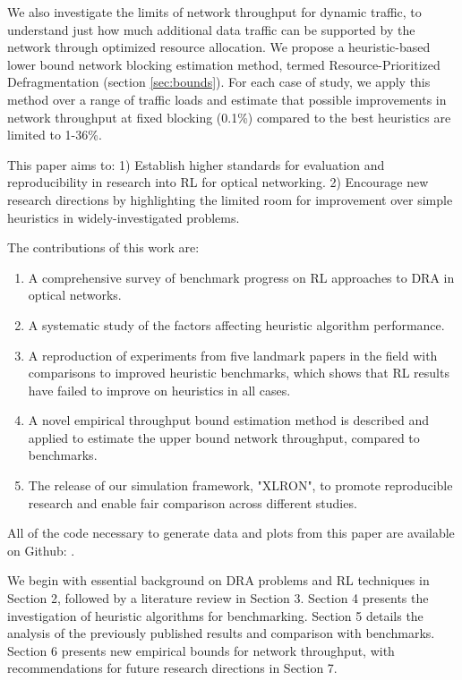 We also investigate the limits of network throughput for dynamic traffic, to understand just how much additional data traffic can be supported by the network through optimized resource allocation. We propose a heuristic-based lower bound network blocking estimation method, termed Resource-Prioritized Defragmentation (section \ref{sec:bounds}). For each case of study, we apply this method over a range of traffic loads and estimate that possible improvements in network throughput at fixed blocking (0.1\%) compared to the best heuristics are limited to 1-36\%.

This paper aims to: 1) Establish higher standards for evaluation and reproducibility in research into RL for optical networking. 2) Encourage new research directions by highlighting the limited room for improvement over simple heuristics in widely-investigated problems. 

The contributions of this work are:
\begin{enumerate}[itemsep=0pt]
    \item A comprehensive survey of benchmark progress on RL approaches to DRA in optical networks.
    \item A systematic study of the factors affecting heuristic algorithm performance.
    \item A reproduction of experiments from five landmark papers in the field with comparisons to improved heuristic benchmarks, which shows that RL results have failed to improve on heuristics in all cases.
    \item A novel empirical throughput bound estimation method is described and applied to estimate the upper bound network throughput, compared to benchmarks.
    \item The release of our simulation framework, "XLRON", to promote reproducible research and enable fair comparison across different studies.
\end{enumerate}

All of the code necessary to generate data and plots from this paper are available on Github: \cite{michael_doherty_micdohxlron_2024}.

We begin with essential background on DRA problems and RL techniques in Section 2, followed by a literature review in Section 3. Section 4 presents the investigation of heuristic algorithms for benchmarking. Section 5 details the analysis of the previously published results and comparison with benchmarks. Section 6 presents new empirical bounds for network throughput, with recommendations for future research directions in Section 7.







